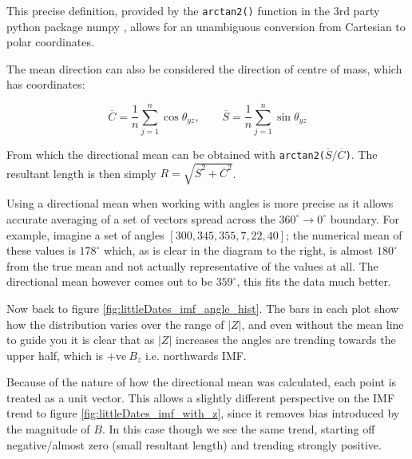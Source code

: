 \documentclass[12pt]{article}
\newcommand{\incfig}[2][1]{
    \def\svgwidth{#1\textwidth}
    
}
\newenvironment{Figure}
  {\par\medskip\noindent\minipage{\linewidth}}
  {\endminipage\par\medskip}
\begin{document}
This precise definition, provided by the \verb|arctan2()| \cite{arctan2} function in the 3rd party python package numpy \cite{numpy}, allows for an unambiguous conversion from Cartesian to polar coordinates. 

The mean direction can also be considered the direction of centre of mass, which has coordinates:

\begin{equation}
    \overline{C} = \frac{1}{n}\sum_{j=1}^n \cos\theta_{yz}, \qquad \overline{S}=\frac{1}{n}\sum_{j=1}^n\sin\theta_{yz}
\end{equation}

From which the directional mean can be obtained with \verb|arctan2(|$\overline{S}/\overline{C}$\verb|)|. The resultant length is then simply $R=\sqrt{\overline{S}^2+\overline{C}^2}$.

\begin{Figure}
    \centering
    \incfig[0.3]{angleExample}
    \hspace{2cm}
    \incfig[0.3]{angleReference}
\end{Figure}

Using a directional mean when working with angles is more precise as it allows accurate averaging of a set of vectors spread across the $360^\circ\rightarrow0^\circ$ boundary. For example, imagine a set of angles $[300, 345, 355, 7, 22, 40]$; the numerical mean of these values is $178^\circ$ which, as is clear in the diagram to the right, is almost $180^\circ$ from the true mean and not actually representative of the values at all. The directional mean however comes out to be $359^\circ$, this fits the data much better.

Now back to figure \ref{fig:littleDates_imf_angle_hist}. The bars in each plot show how the distribution varies over the range of $|Z|$, and even without the mean line to guide you it is clear that as $|Z|$ increases the angles are trending towards the upper half, which is $+\text{ve}\ B_z$ i.e. northwards IMF.

Because of the nature of how the directional mean was calculated, each point is treated as a unit vector. This allows a slightly different perspective on the IMF trend to figure \ref{fig:littleDates_imf_with_z}, since it removes bias introduced by the magnitude of $B$. In this case though we see the same trend, starting off negative/almost zero (small resultant length) and trending strongly positive.
\end{document}
